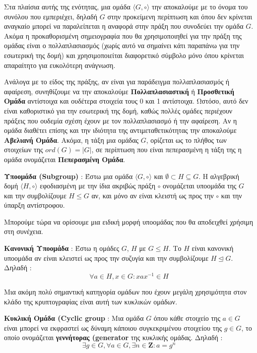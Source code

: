 Στα πλαίσια αυτής της ενότητας, μια ομάδα $\langle G, \circ \rangle$ την αποκαλούμε με το όνομα του συνόλου που εμπεριέχει, δηλαδή $G$ στην προκείμενη περίπτωση και όπου δεν κρίνεται αναγκαίο μπορεί να παραλείπεται η αναφορά στην πράξη που συνοδεύει την ομάδα $G$. Ακόμα η προκαθορισμένη σημειογραφία που θα χρησιμοποιηθεί για την πράξη της ομάδας είναι ο πολλαπλασιασμός (χωρίς αυτό να σημαίνει κάτι παραπάνω για την εσωτερική της δομή) και χρησιμοποιείται διαφορετικό σύμβολο μόνο όπου κρίνεται απαραίτητο για ευκολότερη ανάγνωση.

Ανάλογα με το είδος της πράξης, αν είναι για παράδειγμα πολλαπλασιασμός ή αφαίρεση, συνηθίζουμε να την αποκαλούμε \textbf{Πολλαπλασιαστική} ή \textbf{Προσθετική Ομάδα} αντίστοιχα και ουδέτερα στοιχεία τους 0 και 1 αντίστοιχα. Ωστόσο, αυτό δεν είναι καθοριστικό για την εσωτερική της δομή, καθώς πολλές ομάδες περιέχουν πράξεις που ουδεμία σχέση έχουν με τον πολλαπλασιασμό ή την αφαίρεση. Αν η ομάδα διαθέτει επίσης και την ιδιότητα της αντιμεταθετικότητας την αποκαλούμε \textbf{Αβελιανή Ομάδα}. Ακόμα, η τάξη μια ομάδας $G$, ορίζεται ως το πλήθος των στοιχείων της $ord(G)=|G|$, σε περίπτωση που είναι πεπερασμένη η τάξη της η ομάδα ονομάζεται \textbf{Πεπερασμένη Ομάδα}.

\begin{definition}
\textbf{Υποομάδα (Subgroup)} : Έστω μια ομάδα $\langle G, \circ \rangle$ και $\emptyset \subset Η \subseteq G$. Η αλγεβρική δομή $\langle H, \circ \rangle$ εφοδιασμένη με την ίδια ακριβώς πράξη $\circ$ ονομάζεται υποομάδα της $G$ και την συμβολίζουμε $H \leq G$ αν, και μόνο αν είναι κλειστή ως προς την $\circ$ και την ύπαρξη αντίστροφου. 
\end{definition}

Μπορούμε τώρα να ορίσουμε μια ειδική μορφή υποομάδας που θα αποδειχθεί χρήσιμη στη συνέχεια.

\begin{definition}
\textbf{Κανονική Υποομάδα} : Έστω η ομάδες $G$, $H$ με $G \leq H$. Το $H$ είναι κανονική υποομάδα αν είναι κλειστεί ως προς την συζυγία και την συμβολίζουμε $H \trianglelefteq G$. Δηλαδή :
$$
\forall a \in H, x \in G : xax^{-1} \in H
$$
\end{definition}

Μια ακόμη πολύ σημαντική κατηγορία ομάδων που έχουν μεγάλη χρησιμότητα στον κλάδο της κρυπτογραφίας είναι αυτή των κυκλικών ομάδων.

\begin{definition}
\textbf{Κυκλική Ομάδα (Cyclic group} : Μια ομάδα $G$ όπου κάθε στοιχείο της $a \in G$ είναι μπορεί να εκφραστεί ως δύναμη κάποιου συγκεκριμένου στοιχείου της $g \in G$, το οποίο ονομάζεται \textbf{γεννήτορας (generator} της κυκλικής ομάδας. Δηλαδή :
$$
\exists g \in G, \forall a \in G, \exists n \in \mathbf{Z} : a = g^n
$$
\end{definition}

